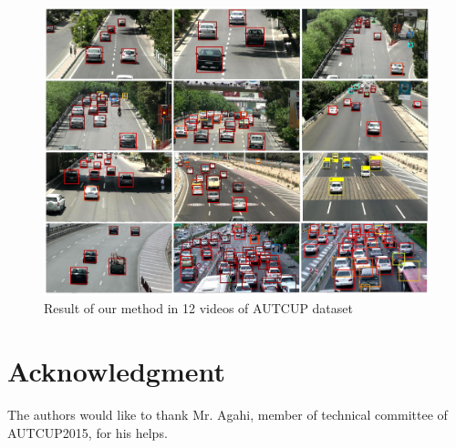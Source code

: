 \documentclass[conference]{IEEEtran}
\begin{document}
\begin{figure}[t]
	\centering
	\includegraphics[width=\textwidth]{images/results.jpg}
	\caption{Result of our method in 12 videos of AUTCUP dataset}
	\label{results}
\end{figure}




\section*{Acknowledgment}


The authors would like to thank Mr. Agahi, member of technical committee of AUTCUP2015, for his helps.





\end{document}
